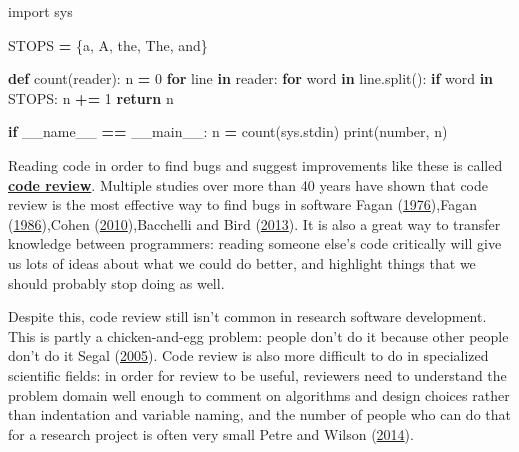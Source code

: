 \documentclass[
]{krantz}
\makeatletter
\newenvironment{Shaded}{\begin{snugshade}}{\end{snugshade}}
\newcommand{\BuiltInTok}[1]{#1}
\newcommand{\ControlFlowTok}[1]{\textcolor[rgb]{0.13,0.29,0.53}{\textbf{#1}}}
\newcommand{\DecValTok}[1]{\textcolor[rgb]{0.00,0.00,0.81}{#1}}
\newcommand{\ImportTok}[1]{#1}
\newcommand{\KeywordTok}[1]{\textcolor[rgb]{0.13,0.29,0.53}{\textbf{#1}}}
\newcommand{\NormalTok}[1]{#1}
\newcommand{\OperatorTok}[1]{\textcolor[rgb]{0.81,0.36,0.00}{\textbf{#1}}}
\newcommand{\StringTok}[1]{\textcolor[rgb]{0.31,0.60,0.02}{#1}}
\newcommand{\VariableTok}[1]{\textcolor[rgb]{0.00,0.00,0.00}{#1}}
\newenvironment{kframe}{%
\medskip{}
\setlength{\fboxsep}{.8em}
 \def\at@end@of@kframe{}%
 \ifinner\ifhmode%
  \def\at@end@of@kframe{\end{minipage}}%
  \begin{minipage}{\columnwidth}%
 \fi\fi%
 \def\FrameCommand##1{\hskip\@totalleftmargin \hskip-\fboxsep
 \colorbox{shadecolor}{##1}\hskip-\fboxsep
     \hskip-\linewidth \hskip-\@totalleftmargin \hskip\columnwidth}%
 \MakeFramed {\advance\hsize-\width
   \@totalleftmargin\z@ \linewidth\hsize
   \@setminipage}}%
 {\par\unskip\endMakeFramed%
 \at@end@of@kframe}
\renewenvironment{Shaded}{\begin{kframe}}{\end{kframe}}
\newcommand{\gref}[2]{\hyperlink{#2}{\textbf{#1}}}
\makeatother
\begin{document}
\begin{Shaded}
\begin{Highlighting}[]
\ImportTok{import}\NormalTok{ sys}


\NormalTok{STOPS }\OperatorTok{=}\NormalTok{ \{}\StringTok{\textquotesingle{}a\textquotesingle{}}\NormalTok{, }\StringTok{\textquotesingle{}A\textquotesingle{}}\NormalTok{, }\StringTok{\textquotesingle{}the\textquotesingle{}}\NormalTok{, }\StringTok{\textquotesingle{}The\textquotesingle{}}\NormalTok{, }\StringTok{\textquotesingle{}and\textquotesingle{}}\NormalTok{\}}


\KeywordTok{def}\NormalTok{ count(reader):}
\NormalTok{    n }\OperatorTok{=} \DecValTok{0}
    \ControlFlowTok{for}\NormalTok{ line }\KeywordTok{in}\NormalTok{ reader:}
        \ControlFlowTok{for}\NormalTok{ word }\KeywordTok{in}\NormalTok{ line.split():}
            \ControlFlowTok{if}\NormalTok{ word }\KeywordTok{in}\NormalTok{ STOPS:}
\NormalTok{                n }\OperatorTok{+=} \DecValTok{1}
    \ControlFlowTok{return}\NormalTok{ n}


\ControlFlowTok{if} \VariableTok{\_\_name\_\_} \OperatorTok{==} \StringTok{\textquotesingle{}\_\_main\_\_\textquotesingle{}}\NormalTok{:}
\NormalTok{    n }\OperatorTok{=}\NormalTok{ count(sys.stdin)}
    \BuiltInTok{print}\NormalTok{(}\StringTok{\textquotesingle{}number\textquotesingle{}}\NormalTok{, n)}
\end{Highlighting}
\end{Shaded}

Reading code in order to find bugs and suggest improvements like these
is called \gref{code review}{code\_review}.
Multiple studies over more than 40 years have shown that
code review is the most effective way to find bugs in software
Fagan (\protect\hyperlink{ref-Faga1976}{1976}),Fagan (\protect\hyperlink{ref-Faga1986}{1986}),Cohen (\protect\hyperlink{ref-Cohe2010}{2010}),Bacchelli and Bird (\protect\hyperlink{ref-Bacc2013}{2013}).
It is also a great way to transfer knowledge between programmers:
reading someone else's code critically will give us lots of ideas about what we could do better,
and highlight things that we should probably stop doing as well.

Despite this,
code review still isn't common in research software development.
This is partly a chicken-and-egg problem:
people don't do it because other people don't do it Segal (\protect\hyperlink{ref-Sega2005}{2005}).
Code review is also more difficult to do in specialized scientific fields:
in order for review to be useful,
reviewers need to understand the problem domain well enough to comment on algorithms and design choices
rather than indentation and variable naming,
and the number of people who can do that for a research project is often very small Petre and Wilson (\protect\hyperlink{ref-Petr2014}{2014}).
\end{document}
